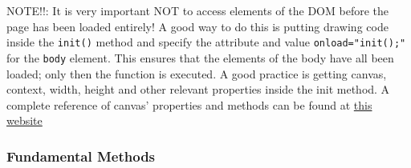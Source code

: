 \documentclass[a4paper,11pt]{book}
\begin{document}
	NOTE!!: It is very important NOT to access elements of the DOM before the
	page has
	been loaded entirely! A good way to do this is putting drawing code inside the
	\texttt{init()}
	method and specify the attribute and value \texttt{onload="init();"} for the
	\texttt{body} element. This ensures that the elements of the body have all been
	loaded; only then the function is executed.
	A good practice is getting canvas, context, width, height and
	other relevant properties inside the init method.
	A complete reference of canvas' properties and methods can be
	found at \href{https://simon.html5.org/dump/html5-canvas-cheat-sheet.html}{this website}
	
	\subsubsection{Fundamental Methods}
\end{document}
